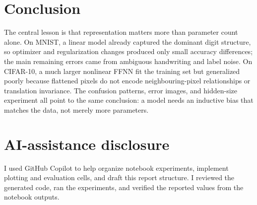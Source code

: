 \documentclass[11pt]{article}
\begin{document}
\section{Conclusion}
The central lesson is that representation matters more than parameter count alone. On MNIST, a linear model already captured the dominant digit structure, so optimizer and regularization changes produced only small accuracy differences; the main remaining errors came from ambiguous handwriting and label noise. On CIFAR-10, a much larger nonlinear FFNN fit the training set but generalized poorly because flattened pixels do not encode neighbouring-pixel relationships or translation invariance. The confusion patterns, error images, and hidden-size experiment all point to the same conclusion: a model needs an inductive bias that matches the data, not merely more parameters.

\section*{AI-assistance disclosure}
I used GitHub Copilot to help organize notebook experiments, implement plotting and evaluation cells, and draft this report structure. I reviewed the generated code, ran the experiments, and verified the reported values from the notebook outputs.
\end{document}
